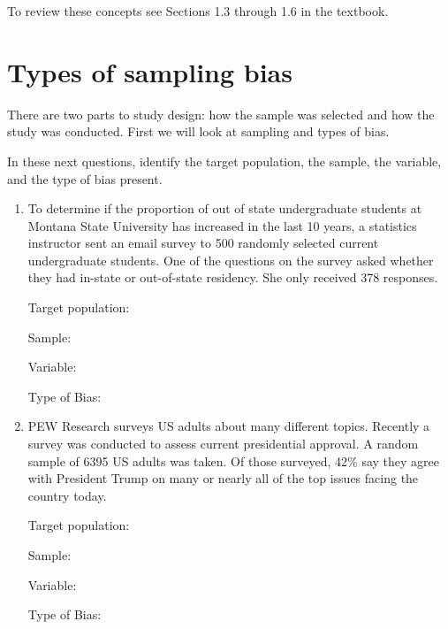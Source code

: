 \documentclass[
]{report}
\begin{document}
To review these concepts see Sections 1.3 through 1.6 in the textbook.

\newpage

\hypertarget{types-of-sampling-bias}{%
\section{Types of sampling bias}\label{types-of-sampling-bias}}

There are two parts to study design: how the sample was selected and how the study was conducted. First we will look at sampling and types of bias.

In these next questions, identify the target population, the sample, the variable, and the type of bias present.

\begin{enumerate}
\def\labelenumi{\arabic{enumi}.}
\item
  To determine if the proportion of out of state undergraduate students at Montana State University has increased in the last 10 years, a statistics instructor sent an email survey to 500 randomly selected current undergraduate students. One of the questions on the survey asked whether they had in-state or out-of-state residency. She only received 378 responses.
  \vspace{0.25in}

  Target population:
  \vspace{0.3in}

  Sample:
  \vspace{0.3in}

  Variable:
  \vspace{0.3in}

  Type of Bias:
  \vspace{0.3in}
\item
  PEW Research surveys US adults about many different topics. Recently a survey was conducted to assess current presidential approval. A random sample of 6395 US adults was taken. Of those surveyed, 42\% say they agree with President Trump on many or nearly all of the top issues facing the country today.
  \vspace{0.25in}

  Target population:
  \vspace{0.3in}

  Sample:
  \vspace{0.3in}

  Variable:
  \vspace{0.3in}

  Type of Bias:
  \vspace{0.3in}
\end{enumerate}
\end{document}
